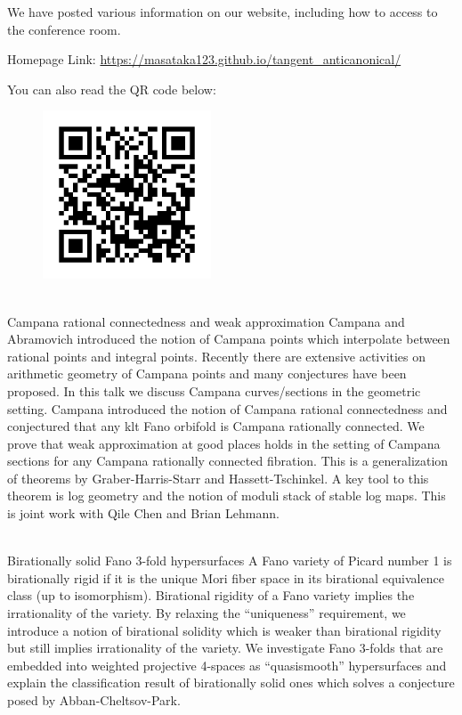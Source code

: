 \documentclass[dvipdfmx,a4paper,12pt]{article}
\theoremstyle{plain} %
\theoremstyle{definition} %
\begin{document}
\vskip3mm

We have posted various information on our website, including how to access to the conference room.

\vskip3mm
Homepage Link: \url{https://masataka123.github.io/tangent_anticanonical/}

You can also read the QR code below:

\begin{figure}[htbp]
\begin{center}
 \includegraphics[height=50mm, width=50mm]{tangent_anticanonical.png}
\end{center}
\end{figure}



\newpage

\vskip3mm

\vskip3mm
\\
 Campana rational connectedness and weak approximation
\vskip3mm
Campana and Abramovich introduced the notion of Campana points which interpolate between rational points and integral points. Recently there are extensive activities on arithmetic geometry of Campana points and many conjectures have been proposed. In this talk we discuss Campana curves/sections in the geometric setting. Campana introduced the notion of Campana rational connectedness and conjectured that any klt Fano orbifold is Campana rationally connected. We prove that weak approximation at good places holds in the setting of Campana sections for any Campana rationally connected fibration. This is a generalization of theorems by Graber-Harris-Starr and Hassett-Tschinkel. A key tool to this theorem is log geometry and the notion of moduli stack of stable log maps. This is joint work with Qile Chen and Brian Lehmann. 
\vskip5mm

\\
Birationally solid Fano 3-fold hypersurfaces
\vskip3mm
A Fano variety of Picard number 1 is birationally rigid if it is the unique Mori fiber space in its birational equivalence class (up to isomorphism). Birational rigidity of a Fano variety implies the irrationality of the variety. By relaxing the “uniqueness” requirement, we introduce a notion of birational solidity which is weaker than birational rigidity but still implies irrationality of the variety. We investigate Fano 3-folds that are embedded into weighted projective 4-spaces as “quasismooth” hypersurfaces and explain the classification result of birationally solid ones which solves a conjecture posed by Abban-Cheltsov-Park.
\vskip5mm
\end{document}

